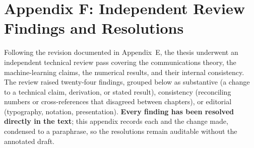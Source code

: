 \section{Appendix F: Independent Review Findings and Resolutions}\label{sec:appendix-review-resolutions}

Following the revision documented in Appendix~E, the thesis underwent an independent technical review pass covering the communications theory, the machine-learning claims, the numerical results, and their internal consistency. The review raised twenty-four findings, grouped below as substantive (a change to a technical claim, derivation, or stated result), consistency (reconciling numbers or cross-references that disagreed between chapters), or editorial (typography, notation, presentation). \textbf{Every finding has been resolved directly in the text}; this appendix records each and the change made, condensed to a paraphrase, so the resolutions remain auditable without the annotated draft.

